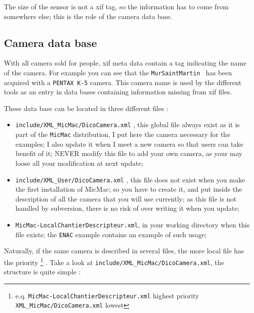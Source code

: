 The size of the sensor is not a xif tag, so the information has to come from
somewhere else; this is the role of the camera data base.


\subsection{Camera data base}
\label{CamDB}

With all camera sold for people, xif meta data contain a tag indicating the
name of the camera.  For example you can see that the {\tt MurSaintMartin }
has been acquired with a {\tt PENTAX K-5} camera. This camera name is
used by the different tools as an entry in data bases containing  information
missing from xif files.

These data base can be located in three different files :

\begin{itemize}
   \item  {\tt  include/XML\_MicMac/DicoCamera.xml} , this global file always exist as
         it is part of the {\tt MicMac} distribution, I put here the camera necessary
         for the examples; I also update it when I meet a new camera
         so that users can take benefit of it;
         NEVER modify this file to add your own camera, as your may loose all your
         modification at next update;

   \item  {\tt  include/XML\_User/DicoCamera.xml} , this file does not exist
         when you make the first installation of MicMac; so you have to create it,
         and put inside the description of all the camera that you will use
         currently; as this file is not handled by subversion, there is no risk
         of over writing it when you update;

   \item  {\tt  MicMac-LocalChantierDescripteur.xml},  in your working
          directory when this file exists; the {\tt ENAC} example contains
          an example of such usage;
\end{itemize}

Naturally, if the same camera is described in several files, the more local file has the
priority \footnote{e.q. {\tt MicMac-LocalChantierDescripteur.xml} highest priority
{\tt XML\_MicMac/DicoCamera.xml} lowest} .
Take a look at  {\tt  include/XML\_MicMac/DicoCamera.xml}, the structure is quite
simple :

